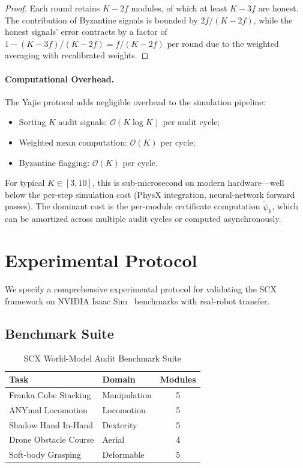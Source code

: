 \documentclass[11pt,twocolumn]{article}
\theoremstyle{definition}
\begin{document}
\begin{proof}
Each round retains $K-2f$ modules, of which at least $K-3f$ are honest.
The contribution of Byzantine signals is bounded by $2f/(K-2f)$, while the
honest signals' error contracts by a factor of $1 - (K-3f)/(K-2f) = f/(K-2f)$
per round due to the weighted averaging with recalibrated weights.
\end{proof}

\paragraph{Computational Overhead.}
The Yajie protocol adds negligible overhead to the simulation pipeline:
\begin{itemize}[nosep]
  \item Sorting $K$ audit signals: $\mathcal{O}(K \log K)$ per audit cycle;
  \item Weighted mean computation: $\mathcal{O}(K)$ per cycle;
  \item Byzantine flagging: $\mathcal{O}(K)$ per cycle.
\end{itemize}
For typical $K \in [3, 10]$, this is sub-microsecond on modern hardware---well
below the per-step simulation cost (PhysX integration, neural-network forward
passes).  The dominant cost is the per-module certificate computation
$\tilde{\psi}_k$, which can be amortized across multiple audit cycles or
computed asynchronously.

\section{Experimental Protocol}
\label{sec:experiments}

We specify a comprehensive experimental protocol for validating the SCX
framework on NVIDIA Isaac Sim~\cite{isaacsim2023} benchmarks with real-robot
transfer.

\subsection{Benchmark Suite}

\begin{table}[t]
\centering
\caption{SCX World-Model Audit Benchmark Suite}
\label{tab:benchmarks}
\begin{tabular}{@{}llc@{}}
\toprule
\textbf{Task} & \textbf{Domain} & \textbf{Modules} \\
\midrule
Franka Cube Stacking   & Manipulation  & 5 \\
ANYmal Locomotion      & Locomotion    & 5 \\
Shadow Hand In-Hand    & Dexterity     & 5 \\
Drone Obstacle Course  & Aerial        & 4 \\
Soft-body Grasping     & Deformable    & 5 \\
\bottomrule
\end{tabular}
\end{table}
\end{document}
